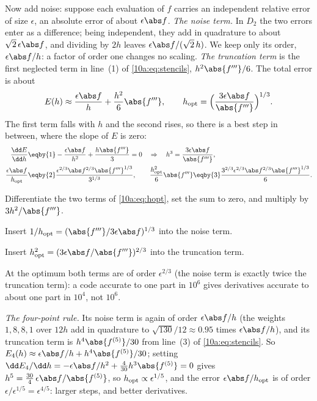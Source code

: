Now add noise: suppose each evaluation of $f$ carries an independent relative error of size $\epsilon$, an
absolute error of about $\epsilon\abs f$. \emph{The noise term.} In $D_2$ the two errors enter as a difference;
being independent, they add in quadrature to about $\sqrt2\,\epsilon\abs f$, and dividing by $2h$ leaves
$\epsilon\abs f/(\sqrt2\,h)$. We keep only its order, $\epsilon\abs f/h$: a factor of order one changes no scaling.
\emph{The truncation term} is the first neglected term in line~(1) of \eqref{10a:eq:stencils}, $h^2\abs{f'''}/6$. The
total error is about
\begin{equation}
  E(h)\approx\frac{\epsilon\abs f}{h}+\frac{h^2}{6}\abs{f'''},
  \qquad
  h_{\rm opt}=\Bigl(\frac{3\epsilon\abs f}{\abs{f'''}}\Bigr)^{1/3}.
  \label{10a:eq:hopt}
\end{equation}
The first term falls with $h$ and the second rises, so there is a best step in between, where the slope of $E$ is
zero:
\begin{align*}
  \frac{\dd E}{\dd h}
  &\eqby{1}-\frac{\epsilon\abs f}{h^2}+\frac{h\abs{f'''}}3=0
  \quad\Rightarrow\quad h^3=\frac{3\epsilon\abs f}{\abs{f'''}},
  \\
  \frac{\epsilon\abs f}{h_{\rm opt}}
  &\eqby{2}\frac{\epsilon^{2/3}\abs f^{2/3}\abs{f'''}^{1/3}}{3^{1/3}},
  \qquad
  \frac{h_{\rm opt}^2}6\abs{f'''}\eqby{3}\frac{3^{2/3}\epsilon^{2/3}\abs f^{2/3}\abs{f'''}^{1/3}}6 .
\end{align*}
\begin{explain}
  \item Differentiate the two terms of \eqref{10a:eq:hopt}, set the sum to zero, and multiply by $3h^2/\abs{f'''}$.
  \item Insert $1/h_{\rm opt}=(\abs{f'''}/3\epsilon\abs f)^{1/3}$ into the noise term.
  \item Insert $h_{\rm opt}^2=(3\epsilon\abs f/\abs{f'''})^{2/3}$ into the truncation term.
\end{explain}
At the optimum both terms are of order $\epsilon^{2/3}$ (the noise term is exactly twice the truncation term): a
code accurate to one part in $10^6$ gives derivatives accurate to about one part in $10^4$, not $10^6$.

\emph{The four-point rule.} Its noise term is again of order $\epsilon\abs f/h$ (the weights $1,8,8,1$ over $12h$ add
in quadrature to $\sqrt{130}/12\approx0.95$ times $\epsilon\abs f/h$), and its truncation term is $h^4\abs{f^{(5)}}/30$ from line~(3)
of \eqref{10a:eq:stencils}. So $E_4(h)\approx\epsilon\abs f/h+h^4\abs{f^{(5)}}/30$; setting
$\dd E_4/\dd h=-\epsilon\abs f/h^2+\frac4{30}h^3\abs{f^{(5)}}=0$ gives $h^5=\frac{30}4\,\epsilon\abs f/\abs{f^{(5)}}$, so
$h_{\rm opt}\propto\epsilon^{1/5}$, and the error $\epsilon\abs f/h_{\rm opt}$ is of order $\epsilon/\epsilon^{1/5}=\epsilon^{4/5}$: larger steps,
and better derivatives.

